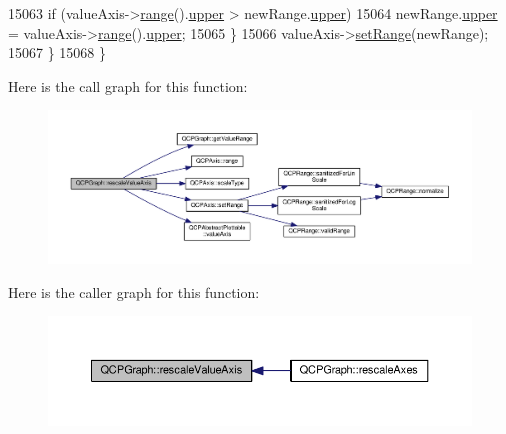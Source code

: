 \begin{DoxyCode}
15063       \textcolor{keywordflow}{if} (valueAxis->\hyperlink{class_q_c_p_axis_ab1ea79a4f5ea4cf42620f8f51c477ac4}{range}().\hyperlink{class_q_c_p_range_ae44eb3aafe1d0e2ed34b499b6d2e074f}{upper} > newRange.\hyperlink{class_q_c_p_range_ae44eb3aafe1d0e2ed34b499b6d2e074f}{upper})
15064         newRange.\hyperlink{class_q_c_p_range_ae44eb3aafe1d0e2ed34b499b6d2e074f}{upper} = valueAxis->\hyperlink{class_q_c_p_axis_ab1ea79a4f5ea4cf42620f8f51c477ac4}{range}().\hyperlink{class_q_c_p_range_ae44eb3aafe1d0e2ed34b499b6d2e074f}{upper};
15065     \}
15066     valueAxis->\hyperlink{class_q_c_p_axis_aebdfea5d44c3a0ad2b4700cd4d25b641}{setRange}(newRange);
15067   \}
15068 \}
\end{DoxyCode}


Here is the call graph for this function\+:\nopagebreak
\begin{figure}[H]
\begin{center}
\leavevmode
\includegraphics[width=350pt]{class_q_c_p_graph_a2ba0e1df416486d7e74299ef8cf68bba_cgraph}
\end{center}
\end{figure}




Here is the caller graph for this function\+:\nopagebreak
\begin{figure}[H]
\begin{center}
\leavevmode
\includegraphics[width=350pt]{class_q_c_p_graph_a2ba0e1df416486d7e74299ef8cf68bba_icgraph}
\end{center}
\end{figure}


\hypertarget{class_q_c_p_graph_ae0227c79f4e42a350c2c99fb2fb879db}{}
